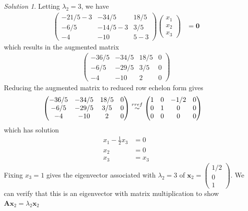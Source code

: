 \documentclass[
]{book}
\theoremstyle{definition}
\theoremstyle{definition}
\theoremstyle{definition}
\theoremstyle{definition}
\theoremstyle{remark}
\newtheorem*{solution}{Solution}
\begin{document}
\begin{solution}
Letting \(\lambda_2 = 3\), we have
\[
\begin{aligned}
\begin{pmatrix} 
-21/5  - 3 & -34/5 & 18/5 \\
-6/5 & -14/5 - 3 & 3/5 \\
-4 & -10 & 5 - 3
\end{pmatrix} \begin{pmatrix} x_1 \\ x_2 \\ x_3 \end{pmatrix} & = \mathbf{0}
\end{aligned}
\]
which results in the augmented matrix
\[
\begin{aligned}
\begin{pmatrix} -36/5 & -34/5 & 18/5 & 0 \\ -6/5 & -29/5 & 3/5 & 0 \\ -4 & -10 & 2 & 0 \end{pmatrix}
\end{aligned}
\]
Reducing the augmented matrix to reduced row echelon form gives
\[
\begin{aligned}
\begin{pmatrix} -36/5 & -34/5 & 18/5 & 0 \\ -6/5 & -29/5 & 3/5 & 0 \\ -4 & -10 & 2 & 0 \end{pmatrix} & \stackrel{rref}{\huge \sim} \begin{pmatrix} 1 & 0 & -1/2 & 0 \\ 0 & 1 & 0 & 0 \\ 0 & 0 & 0 & 0 \end{pmatrix}
\end{aligned}
\]
which has solution
\[
\begin{aligned}
x_1 - \frac{1}{2} x_3 & = 0 \\
x_2  & = 0 \\
x_3 & = x_3
\end{aligned}
\]
Fixing \(x_3 = 1\) gives the eigenvector associated with \(\lambda_2 = 3\) of \(\mathbf{x}_2 = \begin{pmatrix} 1/2 \\ 0 \\ 1 \end{pmatrix}\). We can verify that this is an eigenvector with matrix multiplication to show \(\mathbf{A} \mathbf{x}_2 = \lambda_2 \mathbf{x}_2\)
\[
\begin{aligned}

\end{aligned}\]
\end{solution}
\end{document}
